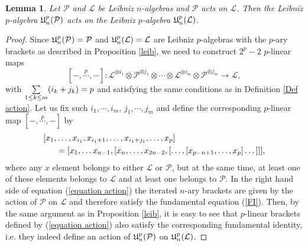 \documentclass[12pt, reqno]{amsart}
\newtheorem{lemma}[definition]{Lemma}
\def\U{\operatorname{\frak{U}}}
\begin{document}
\begin{lemma}\label{Lemma action}
Let $\mathcal{P}$ and $\mathcal{L}$ be Leibniz $n$-algebras and $\mathcal{P}$ acts on $\mathcal{L}$. Then the  Leibniz $p$-algebra $\U_n^p(\mathcal{P})$ acts on the Leibniz $p$-algebra $\U_n^p(\mathcal{L})$.
\end{lemma}
\begin{proof}
Since $\U_n^p(\mathcal{P})=\mathcal{P}$ and $\U_n^p(\mathcal{L})= \mathcal{L} $ are Leibniz $p$-algebras with the $p$-ary brackets as described in Proposition \ref{leib}, we need to construct $2^p-2$ $p$-linear maps
\[
[-,\stackrel{p}{\cdots},-]:\mathcal{L}^{\otimes i_1}\otimes \mathcal{P}^{\otimes
j_1}\otimes\cdots\otimes \mathcal{L}^{\otimes i_m}\otimes
\mathcal{P}^{\otimes j_m}\to \mathcal{L},
\]
with $\underset{\scriptsize{1\leq
k\leq m}}\sum (i_k+j_k)=p$ and satisfying the same conditions as in Definition \ref{Def action}. Let us fix such $i_1, \cdots, i_m$, $j_1, \cdots, j_m$
and define the corresponding $p$-linear map $[-,\stackrel{p}{\cdots},-]$ by
\begin{align}\label{equation action}
[x_1, & \dots, x_{i_1}, x_{i_1 +1}, \dots, x_{i_1+j_1}, \dots,   x_{p}] \notag \\
 & =[x_1, \dots x_{n-1},[x_n, \dots, x_{2n-2}, [\dots,[x_{p-n+1}, \dots, x_{p}] \dots]]],
\end{align}
where any $x$ element belongs to either $\mathcal{L}$ or $\mathcal{P}$, but at the same time, at least one of these elements belongs to $\mathcal{L}$ and at least one belongs to $\mathcal{P}$. In the right hand side of equation (\ref{equation action}) the iterated $n$-ary brackets are given by the action of $\mathcal{P}$ on $\mathcal{L}$ and therefore satisfy the fundamental equation (\ref{FI}). Then, by the same argument as in Proposition \ref{leib}, it is easy to see that $p$-linear brackets defined by (\ref{equation action}) also satisfy the corresponding fundamental identity, i.e. they indeed define an action of $\U_n^p(\mathcal{P})$ on $\U_n^p(\mathcal{L})$.
\end{proof}
\end{document}
